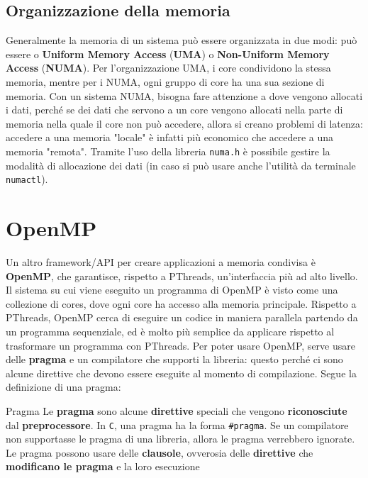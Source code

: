 \subsection{Organizzazione della memoria}

Generalmente la memoria di un sistema può essere organizzata in due modi: può essere o \textbf{Uniform Memory Access} (\textbf{UMA}) o \textbf{Non-Uniform Memory Access} (\textbf{NUMA}). Per l'organizzazione UMA, i core condividono la stessa memoria, mentre per i NUMA, ogni gruppo di core ha una sua sezione di memoria. Con un sistema NUMA, bisogna fare attenzione a dove vengono allocati i dati, perché se dei dati che servono a un core vengono allocati nella parte di memoria nella quale il core non può accedere, allora si creano problemi di latenza: accedere a una memoria "locale" è infatti più economico che accedere a una memoria "remota". Tramite l'uso della libreria \verb|numa.h| è possibile gestire la modalità di allocazione dei dati (in caso si può usare anche l'utilità da terminale \verb|numactl|).
\nl
\section{OpenMP}

Un altro framework/API per creare applicazioni a memoria condivisa è \textbf{OpenMP}, che garantisce, rispetto a PThreads, un'interfaccia più ad alto livello. Il sistema su cui viene eseguito un programma di OpenMP è visto come una collezione di cores, dove ogni core ha accesso alla memoria principale.
\nl
Rispetto a PThreads, OpenMP cerca di eseguire un codice in maniera parallela partendo da un programma sequenziale, ed è molto più semplice da applicare rispetto al trasformare un programma con PThreads. Per poter usare OpenMP, serve usare delle \textbf{pragma} e un compilatore che supporti la libreria: questo perché ci sono alcune direttive che devono essere eseguite al momento di compilazione. Segue la definizione di una pragma:

\begin{definition}{Pragma}
    Le \textbf{pragma} sono alcune \textbf{direttive} speciali che vengono \textbf{riconosciute} dal \textbf{preprocessore}. In \verb|C|, una pragma ha la forma \verb|#pragma|. Se un compilatore non supportasse le pragma di una libreria, allora le pragma verrebbero ignorate.
    \nl
    Le pragma possono usare delle \textbf{clausole}, ovverosia delle \textbf{direttive} che \textbf{modificano le pragma} e la loro esecuzione
\end{definition}

